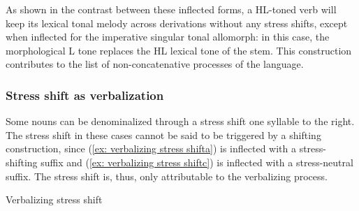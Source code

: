 As shown in the contrast between these inflected forms, a HL-toned verb will keep its lexical tonal melody across derivations without any stress shifts, except when inflected for the imperative singular tonal allomorph: in this case, the morphological L tone replaces the HL lexical tone of the stem. This construction contributes to the list of non-concatenative processes of the language.

\subsubsection{Stress shift as verbalization}
\label{subsubsec: stress shift as verbalization}

Some nouns can be denominalized through a stress shift one syllable to the right. The stress shift in these cases cannot be said to be triggered by a shifting construction, since (\ref{ex: verbalizing stress shifta}) is inflected with a stress-shifting suffix and (\ref{ex: verbalizing stress shiftc}) is inflected with a stress-neutral suffix. The stress shift is, thus, only attributable to the verbalizing process.

\ea\label{ex: verbalizing stress shift}
{Verbalizing stress shift}

    \label{ex: verbalizing stress shifta}
        \label{ex: verbalizing stress shiftb}
            \label{ex: verbalizing stress shiftc}
                \label{ex: verbalizing stress shiftd}
    \z
\z

